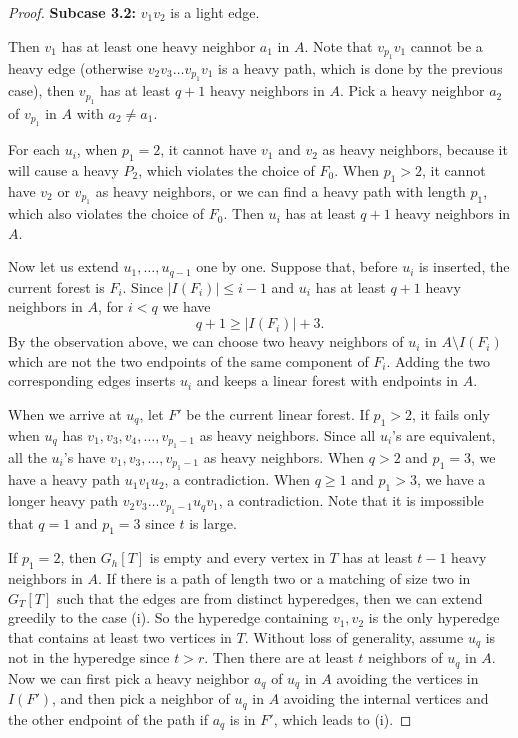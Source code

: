 \documentclass[12pt]{article}
\begin{document}
\begin{proof}
    \textbf{Subcase 3.2:} $v_1v_2$ is a light edge.
    
    Then $v_1$ has at least one heavy neighbor $a_1$ in $A$.
    Note that $v_{p_1}v_1$ cannot be a heavy edge (otherwise $v_2v_3 \dots v_{p_1}v_1$ is a heavy path, which is done by the previous case), then $v_{p_1}$ has at least $q+1$ heavy neighbors in $A$.
    Pick a heavy neighbor $a_2$ of $v_{p_1}$ in $A$ with $a_2 \neq a_1$.

    For each $u_i$, when $p_1 = 2$, it cannot have $v_1$ and $v_2$ as heavy neighbors, because it will cause a heavy $P_2$, which violates the choice of $F_0$.
    When $p_1 > 2$, it cannot have $v_2$ or $v_{p_1}$ as heavy neighbors, or we can find a heavy path with length $p_1$, which also violates the choice of $F_0$.
    Then $u_i$ has at least $q+1$ heavy neighbors in $A$.

Now let us extend $u_1,\ldots,u_{q-1}$ one by one. Suppose that, before
$u_i$ is inserted, the current forest is $F_i$. Since
$|I(F_i)|\le i-1$ and $u_i$ has at least $q+1$ heavy neighbors in
$A$, for $i<q$ we have
$$
q+1 \ge |I(F_i)|+3 .
$$
By the observation above, we can choose two heavy neighbors of $u_i$ in
$A\setminus I(F_i)$ which are not the two endpoints of the same component
of $F_i$. Adding the two corresponding edges inserts $u_i$ and keeps a
linear forest with endpoints in $A$.
    
    

    When we arrive at $u_q$, let $F'$ be the current linear forest.
    If $p_1 > 2$, it fails only when $u_q$ has $v_1, v_3,v_4,\ldots, v_{p_1-1}$ as heavy neighbors.
    Since all $u_i$'s are equivalent, all the $u_i$'s have $v_1, v_3,\ldots, v_{p_1-1}$ as heavy neighbors.
    When $q > 2$ and $p_1 = 3$, we have a heavy path $u_1v_1u_2$, a contradiction.
    When $q \ge 1$ and $p_1 > 3$, we have a longer heavy path $v_2v_3\ldots v_{p_1-1}u_qv_1$, a contradiction.
    Note that it is impossible that $q = 1$ and $p_1 = 3$ since $t$ is large.

    If $p_1 = 2$, then $G_h[T]$ is empty and every vertex in $T$ has at least $t-1$ heavy neighbors in $A$.
    If there is a path of length two or a matching of size two in $G_T[T]$ such that the edges are from distinct hyperedges, then we can extend greedily to the case (i).
    So the hyperedge containing $v_1,v_2$ is the only hyperedge that contains at least two vertices in $T$.
    Without loss of generality, assume $u_q$ is not in the hyperedge since $t > r$.
    Then there are at least $t$ neighbors of $u_q$ in $A$.
    Now we can first pick a heavy neighbor $a_q$ of $u_q$ in $A$ avoiding the vertices in $I(F')$, and then pick a neighbor of $u_q$ in $A$ avoiding the internal vertices and the other endpoint of the path if $a_q$ is in $F'$, which leads to (i).



\end{proof}
\end{document}
